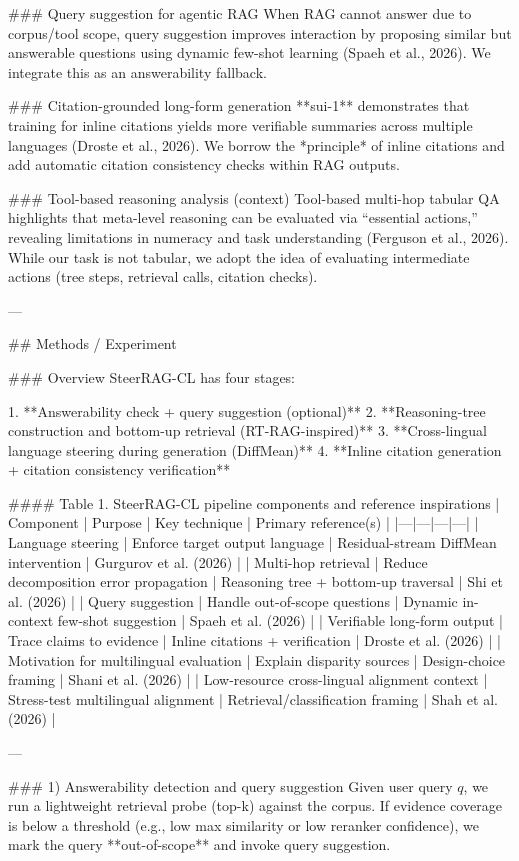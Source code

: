 ### Query suggestion for agentic RAG
When RAG cannot answer due to corpus/tool scope, query suggestion improves interaction by proposing similar but answerable questions using dynamic few-shot learning (Spaeh et al., 2026). We integrate this as an answerability fallback.

### Citation-grounded long-form generation
**sui-1** demonstrates that training for inline citations yields more verifiable summaries across multiple languages (Droste et al., 2026). We borrow the *principle* of inline citations and add automatic citation consistency checks within RAG outputs.

### Tool-based reasoning analysis (context)
Tool-based multi-hop tabular QA highlights that meta-level reasoning can be evaluated via “essential actions,” revealing limitations in numeracy and task understanding (Ferguson et al., 2026). While our task is not tabular, we adopt the idea of evaluating intermediate actions (tree steps, retrieval calls, citation checks).

---

## Methods / Experiment

### Overview
SteerRAG-CL has four stages:

1. **Answerability check + query suggestion (optional)**  
2. **Reasoning-tree construction and bottom-up retrieval (RT-RAG-inspired)**  
3. **Cross-lingual language steering during generation (DiffMean)**  
4. **Inline citation generation + citation consistency verification**

#### Table 1. SteerRAG-CL pipeline components and reference inspirations
| Component | Purpose | Key technique | Primary reference(s) |
|---|---|---|---|
| Language steering | Enforce target output language | Residual-stream DiffMean intervention | Gurgurov et al. (2026) |
| Multi-hop retrieval | Reduce decomposition error propagation | Reasoning tree + bottom-up traversal | Shi et al. (2026) |
| Query suggestion | Handle out-of-scope questions | Dynamic in-context few-shot suggestion | Spaeh et al. (2026) |
| Verifiable long-form output | Trace claims to evidence | Inline citations + verification | Droste et al. (2026) |
| Motivation for multilingual evaluation | Explain disparity sources | Design-choice framing | Shani et al. (2026) |
| Low-resource cross-lingual alignment context | Stress-test multilingual alignment | Retrieval/classification framing | Shah et al. (2026) |

---

### 1) Answerability detection and query suggestion
Given user query \(q\), we run a lightweight retrieval probe (top-k) against the corpus. If evidence coverage is below a threshold (e.g., low max similarity or low reranker confidence), we mark the query **out-of-scope** and invoke query suggestion.

